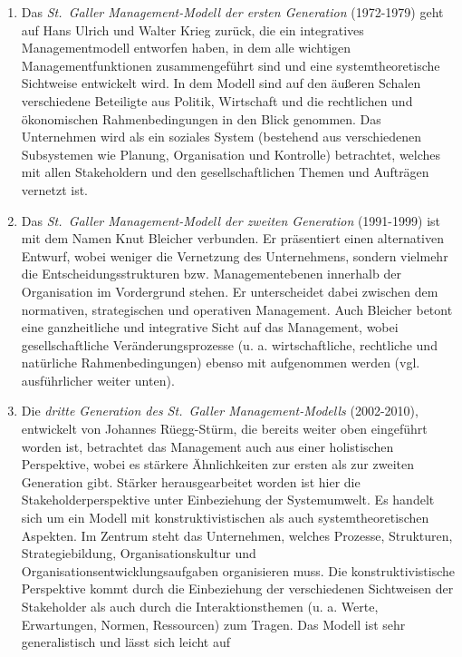 \documentclass[
  letterpaper,
]{book}
\begin{document}
\begin{enumerate}
\def\labelenumi{\arabic{enumi}.}
\item
  Das \emph{St.~Galler Management-Modell der ersten Generation}
  (1972-1979) geht auf Hans Ulrich und Walter Krieg zurück, die ein
  integratives Managementmodell entworfen haben, in dem alle wichtigen
  Managementfunktionen zusammengeführt sind und eine systemtheoretische
  Sichtweise entwickelt wird. In dem Modell sind auf den äußeren Schalen
  verschiedene Beteiligte aus Politik, Wirtschaft und die rechtlichen
  und ökonomischen Rahmenbedingungen in den Blick genommen. Das
  Unternehmen wird als ein soziales System (bestehend aus verschiedenen
  Subsystemen wie Planung, Organisation und Kontrolle) betrachtet,
  welches mit allen Stakeholdern und den gesellschaftlichen Themen und
  Aufträgen vernetzt ist.
\item
  Das \emph{St.~Galler Management-Modell der zweiten Generation}
  (1991-1999) ist mit dem Namen Knut Bleicher verbunden. Er präsentiert
  einen alternativen Entwurf, wobei weniger die Vernetzung des
  Unternehmens, sondern vielmehr die Entscheidungsstrukturen bzw.
  Managementebenen innerhalb der Organisation im Vordergrund stehen. Er
  unterscheidet dabei zwischen dem normativen, strategischen und
  operativen Management. Auch Bleicher betont eine ganzheitliche und
  integrative Sicht auf das Management, wobei gesellschaftliche
  Veränderungsprozesse (u. a. wirtschaftliche, rechtliche und natürliche
  Rahmenbedingungen) ebenso mit aufgenommen werden (vgl. ausführlicher
  weiter unten).
\item
  Die \emph{dritte Generation des St.~Galler Management-Modells}
  (2002-2010), entwickelt von Johannes Rüegg-Stürm, die bereits weiter
  oben eingeführt worden ist, betrachtet das Management auch aus einer
  holistischen Perspektive, wobei es stärkere Ähnlichkeiten zur ersten
  als zur zweiten Generation gibt. Stärker herausgearbeitet worden ist
  hier die Stakeholderperspektive unter Einbeziehung der Systemumwelt.
  Es handelt sich um ein Modell mit konstruktivistischen als auch
  systemtheoretischen Aspekten. Im Zentrum steht das Unternehmen,
  welches Prozesse, Strukturen, Strategiebildung, Organisationskultur
  und Organisationsentwicklungsaufgaben organisieren muss. Die
  konstruktivistische Perspektive kommt durch die Einbeziehung der
  verschiedenen Sichtweisen der Stakeholder als auch durch die
  Interaktionsthemen (u. a. Werte, Erwartungen, Normen, Ressourcen) zum
  Tragen. Das Modell ist sehr generalistisch und lässt sich leicht auf

\end{enumerate}
\end{document}
